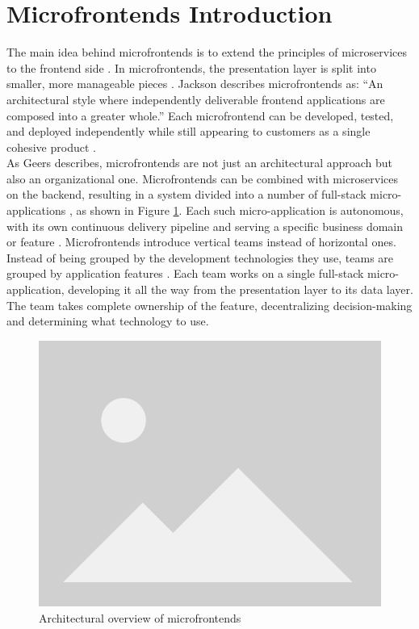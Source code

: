 \section{Microfrontends Introduction}  
The main idea behind microfrontends is to extend the principles of microservices to the frontend side \cite{Montelius}\cite{Geers}. In microfrontends, the presentation layer is split into smaller, more manageable pieces \cite{Montelius}. Jackson \cite{Jackson} describes microfrontends as: “An architectural style where independently deliverable frontend applications are composed into a greater whole.” Each microfrontend can be developed, tested, and deployed independently while still appearing to customers as a single cohesive product \cite{Jackson}. \\ 

\noindent
As Geers \cite{Geers} describes, microfrontends are not just an architectural approach but also an organizational one. Microfrontends can be combined with microservices on the backend, resulting in a system divided into a number of full-stack micro-applications \cite{Montelius}, as shown in Figure \ref{fig:mfe-architecture}. Each such micro-application is autonomous, with its own continuous delivery pipeline and serving a specific business domain or feature \cite{Peltonen}. Microfrontends introduce vertical teams instead of horizontal ones. Instead of being grouped by the development technologies they use, teams are grouped by application features \cite{Montelius}. Each team works on a single full-stack micro-application, developing it all the way from the presentation layer to its data layer. The team takes complete ownership of the feature, decentralizing decision-making and determining what technology to use.  

\begin{figure}[h]  
  \centerline{\includegraphics[width=.5\textwidth]{images/placeholder.png}}  
  \caption[Architectural overview of microfrontends]{Architectural overview of microfrontends}  
  \label{fig:mfe-architecture}  
\end{figure}